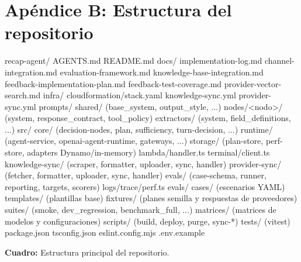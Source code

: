 \documentclass[11pt,a4paper]{article}
\begin{document}
\section{Apéndice B: Estructura del repositorio}

\begin{codeblock}
recap-agent/
  AGENTS.md
  README.md
  docs/
    implementation-log.md
    channel-integration.md
    evaluation-framework.md
    knowledge-base-integration.md
    feedback-implementation-plan.md
    feedback-test-coverage.md
    provider-vector-search.md
  infra/
    cloudformation/stack.yaml
    knowledge-sync.yml
    provider-sync.yml
  prompts/
    shared/         (base_system, output_style, ...)
    nodes/<nodo>/   (system, response_contract, tool_policy)
    extractors/     (system, field_definitions, ...)
  src/
    core/           (decision-nodes, plan, sufficiency, turn-decision, ...)
    runtime/        (agent-service, openai-agent-runtime, gateways, ...)
    storage/        (plan-store, perf-store, adapters Dynamo/in-memory)
    lambda/handler.ts
    terminal/client.ts
    knowledge-sync/ (scraper, formatter, uploader, sync, handler)
    provider-sync/  (fetcher, formatter, uploader, sync, handler)
    evals/          (case-schema, runner, reporting, targets, scorers)
    logs/trace/perf.ts
  evals/
    cases/          (escenarios YAML)
    templates/      (plantillas base)
    fixtures/       (planes semilla y respuestas de proveedores)
    suites/         (smoke, dev_regression, benchmark_full, ...)
    matrices/       (matrices de modelos y configuraciones)
  scripts/          (build, deploy, purge, sync-*)
  tests/            (vitest)
  package.json
  tsconfig.json
  eslint.config.mjs
  .env.example
\end{codeblock}

\noindent\textbf{Cuadro:} Estructura principal del repositorio.
\end{document}
